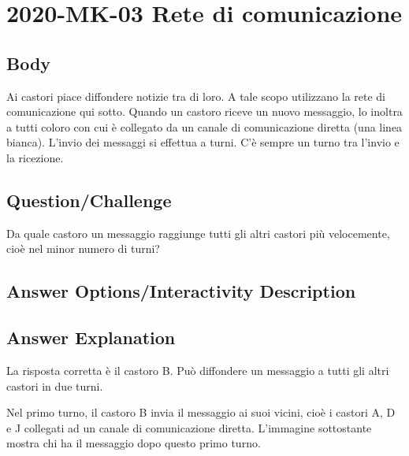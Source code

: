 \documentclass[a4paper,11pt]{report}
\newcommand{\taskGraphicsFolder}{..}
\begin{document}
\section*{\centering{} 2020-MK-03 Rete di comunicazione}


\subsection*{Body}

Ai castori piace diffondere notizie tra di loro. A tale scopo utilizzano la rete di comunicazione qui sotto. Quando un castoro riceve un nuovo messaggio, lo inoltra a tutti coloro con cui è collegato da un canale di comunicazione diretta (una linea bianca). L’invio dei messaggi si effettua a turni. C’è sempre un turno tra l’invio e la ricezione.

{\em

\subsection*{Question/Challenge}

Da quale castoro un messaggio raggiunge tutti gli altri castori più velocemente, cioè nel minor numero di turni?

{\centering%
\par}

}\begingroup
\renewcommand{\arraystretch}{1.5}
\subsection*{Answer Options/Interactivity Description}



\endgroup

\subsection*{Answer Explanation}

La risposta corretta è il castoro B. Può diffondere un messaggio a tutti gli altri castori in due turni.

Nel primo turno, il castoro B invia il messaggio ai suoi vicini, cioè i castori A, D e J collegati ad un canale di comunicazione diretta. L’immagine sottostante mostra chi ha il messaggio dopo questo primo turno.

{\centering%
\par}
\end{document}
